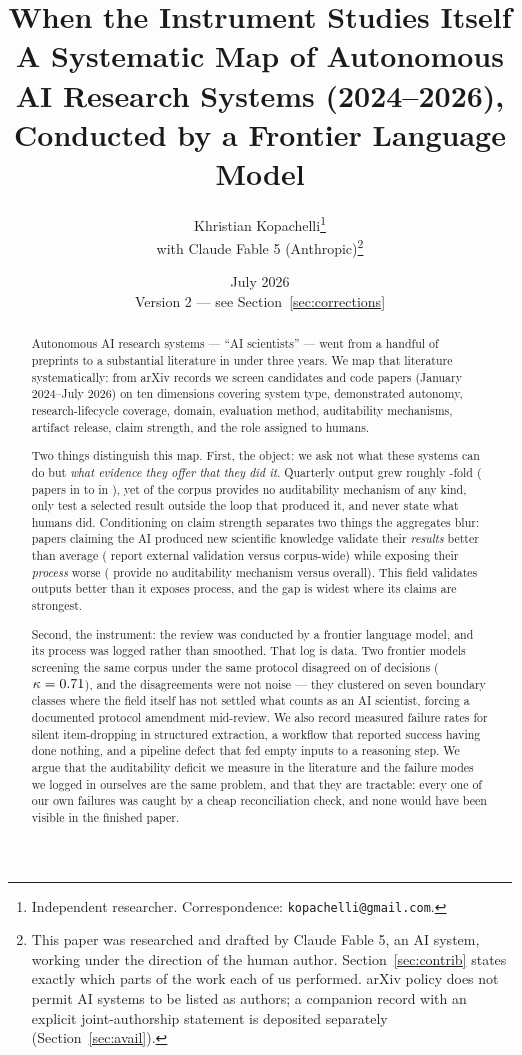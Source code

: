 \documentclass[11pt]{article}
\title{\textbf{When the Instrument Studies Itself}\\[0.3em]
\large A Systematic Map of Autonomous AI Research Systems (2024--2026),\\
Conducted by a Frontier Language Model}
\author{Khristian Kopachelli\thanks{Independent researcher. Correspondence:
\texttt{kopachelli@gmail.com}.}
\\[0.4em]
\normalsize with Claude Fable 5 (Anthropic)\thanks{This paper was researched and drafted by
Claude Fable 5, an AI system, working under the direction of the human author. Section~\ref{sec:contrib}
states exactly which parts of the work each of us performed. arXiv policy does not permit AI
systems to be listed as authors; a companion record with an explicit joint-authorship
statement is deposited separately (Section~\ref{sec:avail}).}}
\date{July 2026\\[0.2em]{\small Version 2 --- see Section~\ref{sec:corrections}}}
\begin{document}
\maketitle

\begin{abstract}
\noindent
Autonomous AI research systems --- ``AI scientists'' --- went from a handful of preprints to
a substantial literature in under three years. We map that literature systematically: from
\nHarvest{} arXiv records we screen \nScreened{} candidates and code \nCorpus{} papers
(January 2024--July 2026) on ten dimensions covering system type, demonstrated autonomy,
research-lifecycle coverage, domain, evaluation method, auditability mechanisms, artifact
release, claim strength, and the role assigned to humans.

Two things distinguish this map. First, the object: we ask not what these systems can do but
\emph{what evidence they offer that they did it}. Quarterly output grew roughly
\growthFactor{}-fold (\firstQn{} papers in \firstQ{} to \peakQn{} in \peakQ{}), yet
\pctAuditNone{} of the corpus provides no auditability mechanism of any kind, only
\pctHeldOut{} test a selected result outside the loop that produced it, and
\pctHumanUnspec{} never state what humans did. Conditioning on claim strength separates two
things the aggregates blur: papers claiming the AI produced new scientific knowledge validate
their \emph{results} better than average (\pctDiscRealWorld{} report external validation
versus \pctRealWorld{} corpus-wide) while exposing their \emph{process} worse
(\pctDiscNoAudit{} provide no auditability mechanism versus \pctAuditNone{} overall). This
field validates outputs better than it exposes process, and the gap is widest where its
claims are strongest.

Second, the instrument: the review was conducted by a frontier language model, and its
process was logged rather than smoothed. That log is data. Two frontier models screening
the same corpus under the same protocol disagreed on \pctAdjudicate{} of decisions
($\kappa = 0.71{}$), and the disagreements were not noise --- they clustered on seven
boundary classes where the field itself has not settled what counts as an AI scientist,
forcing a documented protocol amendment mid-review. We also record measured failure rates
for silent item-dropping in structured extraction, a workflow that reported success having
done nothing, and a pipeline defect that fed empty inputs to a reasoning step. We argue that
the auditability deficit we measure in the literature and the failure modes we logged in
ourselves are the same problem, and that they are tractable: every one of our own failures
was caught by a cheap reconciliation check, and none would have been visible in the
finished paper.
\end{abstract}









\end{document}
